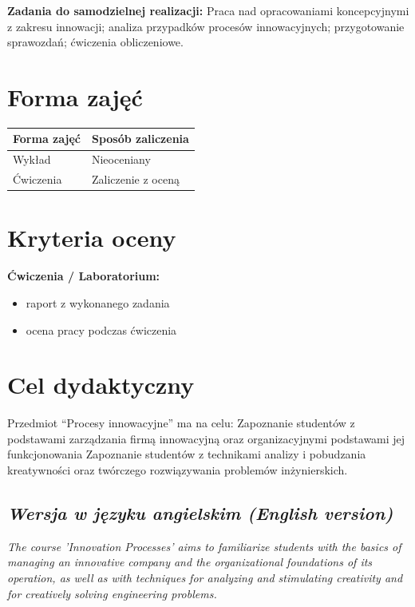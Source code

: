 \documentclass[12pt, a4paper]{article}
\newcommand{\thdrule}{\noalign{\global\setlength{\extrarowheight}{0pt}}}
\newcommand{\thdend}{\noalign{\global\setlength{\extrarowheight}{3pt}}}
\begin{document}
\vspace{4pt}
\noindent\textbf{Zadania do samodzielnej realizacji:} Praca nad opracowaniami koncepcyjnymi z zakresu innowacji; analiza przypadków procesów innowacyjnych; przygotowanie sprawozdań; ćwiczenia obliczeniowe.

\section{Forma zajęć}

\begin{center}
{\scriptsize
\begin{tabular}{m{5cm}m{8cm}}
\thdrule\toprule
\rowcolor{pjatkRed} {\color{white}\textbf{Forma zajęć}} & {\color{white}\textbf{Sposób zaliczenia}} \\
\midrule\thdend
  \rowcolor{tableRowLight} Wykład & Nieoceniany \\
  \rowcolor{tableRowAlt} Ćwiczenia & Zaliczenie z oceną \\
\bottomrule
\end{tabular}}
\end{center}

\section{Kryteria oceny}

\textbf{Ćwiczenia / Laboratorium:}
\begin{itemize}
  \item raport z wykonanego zadania
  \item ocena pracy podczas ćwiczenia
\end{itemize}


\section{Cel dydaktyczny}

Przedmiot “Procesy innowacyjne” ma na celu: Zapoznanie studentów z podstawami zarządzania firmą innowacyjną oraz organizacyjnymi podstawami jej funkcjonowania Zapoznanie studentów z technikami analizy i pobudzania kreatywności oraz twórczego rozwiązywania problemów inżynierskich.

\subsection*{\textit{Wersja w języku angielskim (English version)}}

\textit{The course 'Innovation Processes' aims to familiarize students with the basics of managing an innovative company and the organizational foundations of its operation, as well as with techniques for analyzing and stimulating creativity and for creatively solving engineering problems.}
\end{document}
